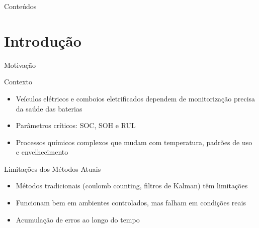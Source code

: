 \documentclass[aspectratio=169,xcolor=dvipsnames]{beamer}
\begin{document}
\begin{frame}[plain]
  \titlepage
\end{frame}

\begin{frame}[plain]{Conteúdos}
  \tableofcontents
\end{frame}

\section{Introdução}
\begin{frame}{Motivação}
  \begin{block}{Contexto}
    \begin{itemize}
      \item Veículos elétricos e comboios eletrificados dependem de monitorização precisa da saúde das baterias
      \item Parâmetros críticos: SOC, SOH e RUL
      \item Processos químicos complexos que mudam com temperatura, padrões de uso e envelhecimento
    \end{itemize}
  \end{block}
  
  \begin{alertblock}{Limitações dos Métodos Atuais}
    \begin{itemize}
      \item Métodos tradicionais (coulomb counting, filtros de Kalman) têm limitações
      \item Funcionam bem em ambientes controlados, mas falham em condições reais
      \item Acumulação de erros ao longo do tempo
    \end{itemize}
  \end{alertblock}
\end{frame}
\end{document}
